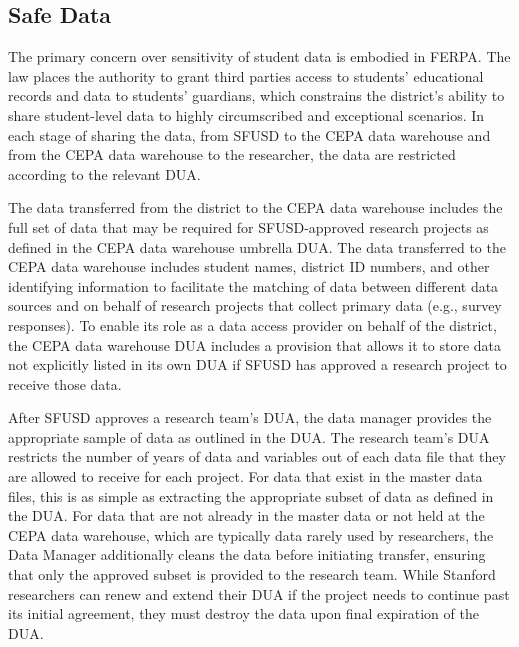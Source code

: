 \hypertarget{safe-data-4}{%
\subsection{Safe Data}\label{safe-data-4}}

The primary concern over sensitivity of student data is embodied in FERPA. The law places the authority to grant third parties access to students' educational records and data to students' guardians, which constrains the district's ability to share student-level data to highly circumscribed and exceptional scenarios. In each stage of sharing the data, from SFUSD to the CEPA data warehouse and from the CEPA data warehouse to the researcher, the data are restricted according to the relevant DUA.

The data transferred from the district to the CEPA data warehouse includes the full set of data that may be required for SFUSD-approved research projects as defined in the CEPA data warehouse umbrella DUA. The data transferred to the CEPA data warehouse includes student names, district ID numbers, and other identifying information to facilitate the matching of data between different data sources and on behalf of research projects that collect primary data (e.g., survey responses). To enable its role as a data access provider on behalf of the district, the CEPA data warehouse DUA includes a provision that allows it to store data not explicitly listed in its own DUA if SFUSD has approved a research project to receive those data.

After SFUSD approves a research team's DUA, the data manager provides the appropriate sample of data as outlined in the DUA. The research team's DUA restricts the number of years of data and variables out of each data file that they are allowed to receive for each project. For data that exist in the master data files, this is as simple as extracting the appropriate subset of data as defined in the DUA. For data that are not already in the master data or not held at the CEPA data warehouse, which are typically data rarely used by researchers, the Data Manager additionally cleans the data before initiating transfer, ensuring that only the approved subset is provided to the research team. While Stanford researchers can renew and extend their DUA if the project needs to continue past its initial agreement, they must destroy the data upon final expiration of the DUA.


